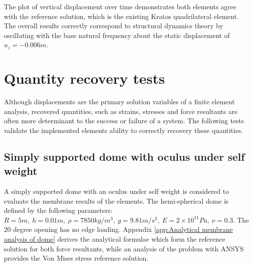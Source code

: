  The plot of vertical displacement over time demonstrates both elements agree with the reference solution, which is the existing Kratos quadrilateral element. The overall results correctly correspond to structural dynamics theory by oscillating with the base natural frequency about the static displacement of $u_z=-0.006m$.

\section{Quantity recovery tests}

Although displacements are the primary solution variables of a finite element analysis, recovered quantities, such as strains, stresses and force resultants are often more determinant to the success or failure of a system. The following tests validate the implemented elements ability to correctly recovery these quantities.

\subsection{Simply supported dome with oculus under self weight}
\label{subsection:dome_test}

A simply supported dome with an oculus under self weight is considered to evaluate the membrane results of the elements. The hemi-spherical dome is defined by the following parameters: $R = 5m,\ h = 0.01m,\ \rho = 7850 kg/m^3,\ g = 9.81m/s^2,\ E = 2 \times 10^{11} Pa,\ \nu = 0.3$. The 20 degree opening has no edge loading. Appendix \ref{app:Analytical membrane analysis of dome} derives the analytical formulae which form the reference solution for both force resultants, while an analysis of the problem with ANSYS provides the Von Mises stress reference solution.

